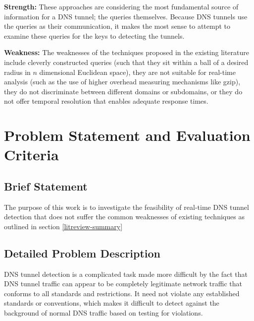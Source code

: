 \documentclass[12pt]{report}
\theoremstyle{remark}
\theoremstyle{definition}
\theoremstyle{definition}
\theoremstyle{definition}
\begin{document}
\begin{itemize}
\textbf{Strength:} These approaches are considering the most fundamental source
of information for a DNS tunnel; the queries themselves. Because DNS tunnels use
the queries as their communication, it makes the most sense to attempt to
examine these queries for the keys to detecting the tunnels.

\textbf{Weakness:} The weaknesses of the techniques proposed in the existing
literature include cleverly constructed queries (such that they sit within a
ball of a desired radius in $n$ dimensional Euclidean space), they are not
suitable for real-time analysis (such as the use of higher overhead measuring
mechanisms like gzip), they do not discriminate between different domains
or subdomains, or they do not offer temporal resolution that enables adequate 
response times.
\end{itemize}

\newpage
\chapter{Problem Statement and Evaluation Criteria}

\section{Brief Statement}
\label{briefproblem}
The purpose of this work is to
investigate the feasibility of real-time DNS tunnel detection that does not
suffer the common weaknesses of existing techniques as outlined in section
\ref{litreview-summary}

\section{Detailed Problem Description}

DNS tunnel detection is a complicated
task made more difficult by the fact that DNS tunnel traffic can appear to be completely
legitimate network traffic that conforms to all standards and restrictions. It
need not violate any established standards or conventions, which makes it
difficult to detect against the background of normal DNS traffic based on
testing for violations.
\end{document}
